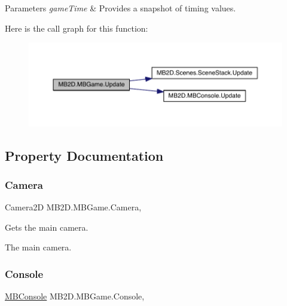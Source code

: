 \begin{DoxyParams}{Parameters}
{\em game\+Time} & Provides a snapshot of timing values.\\
\hline
\end{DoxyParams}
Here is the call graph for this function\+:
\nopagebreak
\begin{figure}[H]
\begin{center}
\leavevmode
\includegraphics[width=350pt]{class_m_b2_d_1_1_m_b_game_a82968a66f75f9c437074ce7bfd468455_cgraph}
\end{center}
\end{figure}


\subsection{Property Documentation}
\hypertarget{class_m_b2_d_1_1_m_b_game_adec48f512c50332353b12a569630defe}{}\label{class_m_b2_d_1_1_m_b_game_adec48f512c50332353b12a569630defe} 
\subsubsection{\texorpdfstring{Camera}{Camera}}
{\footnotesize\ttfamily Camera2D M\+B2\+D.\+M\+B\+Game.\+Camera\hspace{0.3cm}{\ttfamily [static]}, {\ttfamily [get]}}



Gets the main camera. 

The main camera.\hypertarget{class_m_b2_d_1_1_m_b_game_a0db7935dd8a9f15b2dce1031920a4127}{}\label{class_m_b2_d_1_1_m_b_game_a0db7935dd8a9f15b2dce1031920a4127} 
\subsubsection{\texorpdfstring{Console}{Console}}
{\footnotesize\ttfamily \hyperlink{class_m_b2_d_1_1_m_b_console}{M\+B\+Console} M\+B2\+D.\+M\+B\+Game.\+Console\hspace{0.3cm}{\ttfamily [static]}, {\ttfamily [get]}}



